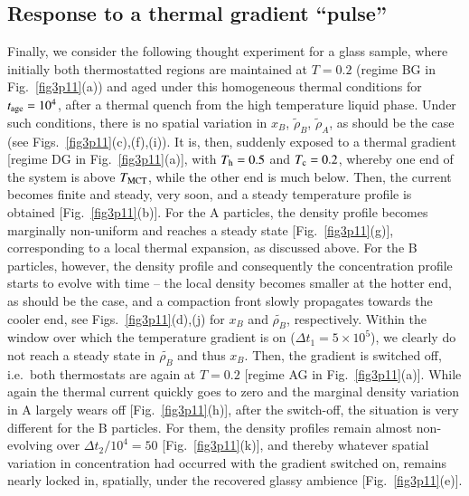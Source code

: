 \subsection{Response to a thermal gradient ``pulse''} 

Finally, we consider the following thought experiment for a glass sample, where initially both thermostatted regions are maintained at $T=0.2$ (regime BG in Fig.~\ref{fig3p11}(a)) and aged under this homogeneous thermal conditions for $t_{\rm age}=10^4$, after a thermal quench from the high temperature liquid phase. Under such conditions, there is no spatial variation in $x_B$, $\tilde{\rho}_B$, $\tilde{\rho}_A$, as should be the case (see Figs.~\ref{fig3p11}(c),(f),(i)).  It is, then, suddenly exposed to a thermal gradient [regime DG in Fig.~\ref{fig3p11}(a)], with $T_{\rm h}=0.5$ and $T_{\rm c}=0.2$, whereby one end of the system is above $T_{\rm MCT}$, while the other end is much below. Then,  the current becomes finite and steady, very soon, and a steady temperature profile is obtained [Fig.~\ref{fig3p11}(b)]. For the A particles, the density profile becomes marginally non-uniform and reaches a steady state [Fig.~\ref{fig3p11}(g)], corresponding to a local thermal expansion, as discussed above.  For the B particles, however, the density profile and consequently the concentration profile starts to evolve with time -- the local density becomes smaller at the hotter end, as should be the case, and a compaction front slowly propagates towards the cooler end, see Figs.~\ref{fig3p11}(d),(j) for $x_B$ and $\tilde{\rho_B}$, respectively.  Within the window over which the temperature gradient is on ($\Delta{t_1}=5\times{10^5}$), we clearly do not reach a steady state in $\tilde{\rho_B}$ and thus $x_B$.  Then, the gradient is switched off, i.e.~both thermostats are again at $T=0.2$ [regime AG in Fig.~\ref{fig3p11}(a)]. While again the thermal current quickly goes to zero and the marginal density variation in A largely wears off [Fig.~\ref{fig3p11}(h)], after the switch-off, the situation is very different for the B particles. For them, the density profiles remain {almost} non-evolving over {$\Delta{t_2}/10^4=50$} [Fig.~\ref{fig3p11}(k)], and thereby whatever spatial variation in concentration had occurred with the gradient switched on, remains {nearly}  locked in, spatially, under the recovered glassy ambience [Fig.~\ref{fig3p11}(e)].

